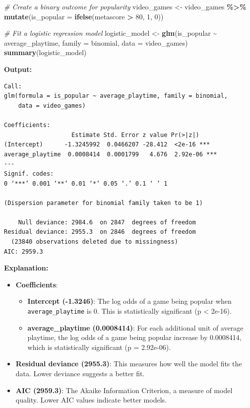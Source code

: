 \documentclass[
]{book}
\newenvironment{Shaded}{\begin{snugshade}}{\end{snugshade}}
\newcommand{\AttributeTok}[1]{\textcolor[rgb]{0.13,0.29,0.53}{#1}}
\newcommand{\CommentTok}[1]{\textcolor[rgb]{0.56,0.35,0.01}{\textit{#1}}}
\newcommand{\DecValTok}[1]{\textcolor[rgb]{0.00,0.00,0.81}{#1}}
\newcommand{\FunctionTok}[1]{\textcolor[rgb]{0.13,0.29,0.53}{\textbf{#1}}}
\newcommand{\NormalTok}[1]{#1}
\newcommand{\OtherTok}[1]{\textcolor[rgb]{0.56,0.35,0.01}{#1}}
\newcommand{\SpecialCharTok}[1]{\textcolor[rgb]{0.81,0.36,0.00}{\textbf{#1}}}
\providecommand{\tightlist}{%
  \setlength{\itemsep}{0pt}\setlength{\parskip}{0pt}}
\begin{document}
\begin{Shaded}
\begin{Highlighting}[]
\CommentTok{\# Create a binary outcome for popularity}
\NormalTok{video\_games }\OtherTok{\textless{}{-}}\NormalTok{ video\_games }\SpecialCharTok{\%\textgreater{}\%}
  \FunctionTok{mutate}\NormalTok{(}\AttributeTok{is\_popular =} \FunctionTok{ifelse}\NormalTok{(metascore }\SpecialCharTok{\textgreater{}} \DecValTok{80}\NormalTok{, }\DecValTok{1}\NormalTok{, }\DecValTok{0}\NormalTok{))}

\CommentTok{\# Fit a logistic regression model}
\NormalTok{logistic\_model }\OtherTok{\textless{}{-}} \FunctionTok{glm}\NormalTok{(is\_popular }\SpecialCharTok{\textasciitilde{}}\NormalTok{ average\_playtime, }\AttributeTok{family =}\NormalTok{ binomial, }\AttributeTok{data =}\NormalTok{ video\_games)}
\FunctionTok{summary}\NormalTok{(logistic\_model)}
\end{Highlighting}
\end{Shaded}

\textbf{Output:}

\begin{verbatim}
Call:
glm(formula = is_popular ~ average_playtime, family = binomial, 
    data = video_games)

Coefficients:
                   Estimate Std. Error z value Pr(>|z|)    
(Intercept)      -1.3245992  0.0466207 -28.412  <2e-16 ***
average_playtime  0.0008414  0.0001799   4.676  2.92e-06 ***
---
Signif. codes:  
0 ‘***’ 0.001 ‘**’ 0.01 ‘*’ 0.05 ‘.’ 0.1 ‘ ’ 1

(Dispersion parameter for binomial family taken to be 1)

    Null deviance: 2984.6  on 2847  degrees of freedom
Residual deviance: 2955.3  on 2846  degrees of freedom
  (23840 observations deleted due to missingness)
AIC: 2959.3
\end{verbatim}

\textbf{Explanation:}

\begin{itemize}
\tightlist
\item
  \textbf{Coefficients}:

  \begin{itemize}
  \tightlist
  \item
    \textbf{Intercept (-1.3246)}: The log odds of a game being popular when \texttt{average\_playtime} is 0. This is statistically significant (p \textless{} 2e-16).
  \item
    \textbf{average\_playtime (0.0008414)}: For each additional unit of average playtime, the log odds of a game being popular increase by 0.0008414, which is statistically significant (p = 2.92e-06).
  \end{itemize}
\item
  \textbf{Residual deviance (2955.3)}: This measures how well the model fits the data. Lower deviance suggests a better fit.
\item
  \textbf{AIC (2959.3)}: The Akaike Information Criterion, a measure of model quality. Lower AIC values indicate better models.
\end{itemize}
\end{document}

